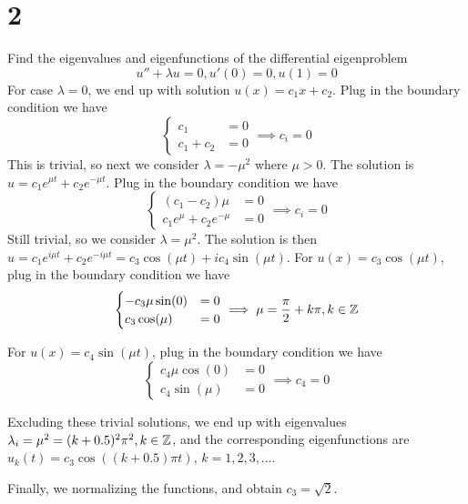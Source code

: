 \documentclass{article}
\begin{document}
\section*{2}
\begin{myleftlinebox}
    Find the eigenvalues and eigenfunctions of the differential eigenproblem
    \[u''+\lambda u=0,u'(0)=0,u(1)=0\]
    \tcbline
    For case \(\lambda=0\), we end up with solution \(u(x)=c_1 x+c_2\). Plug in the boundary condition we have
    \[\begin{cases}
        c_1&=0\\
        c_1+c_2 &= 0
    \end{cases}\implies c_i=0\]
    This is trivial, so next we consider \(\lambda=-\mu^2\) where \(\mu>0\). The solution is \(u=c_1 e^{\mu t}+c_2 e^{-\mu t}\). Plug in the boundary condition we have
    \[\begin{cases}
        (c_1-c_2)\mu&=0\\
        c_1 e^{\mu}+c_2 e^{-\mu} &= 0
    \end{cases}\implies c_i=0\]
    Still trivial, so we consider \(\lambda=\mu^2\). The solution is then \(u=c_1 e^{i\mu t}+c_2 e^{-i\mu t}=c_3\cos(\mu t)+ic_4\sin(\mu t)\).
    For \(u(x)=c_3 \cos (\mu t)\), plug in the boundary condition we have
    \[\begin{cases}
        -c_3\mu\sin(0)&=0\\
        c_3\cos(\mu) &= 0
    \end{cases}\implies \mu=\frac{\pi}{2}+k\pi,k\in \mathbb{Z}\]

    For \(u(x)=c_4 \sin (\mu t)\), plug in the boundary condition we have
    \[\begin{cases}
        c_4\mu\cos(0)&=0\\
        c_4\sin(\mu) &= 0
    \end{cases}\implies c_4=0\]

    Excluding these trivial solutions, we end up with eigenvalues \(\lambda_i=\mu^2=(k+0.5)^2\pi^2,k\in\mathbb{Z}\), and the corresponding eigenfunctions are \(u_k(t)=c_3\cos((k+0.5)\pi t)\), \(k=1,2,3,\dots\).

    Finally, we normalizing the functions, and obtain \(c_3=\sqrt 2\).
\end{myleftlinebox}
\end{document}
